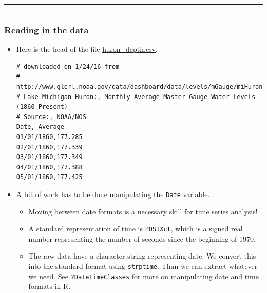 \documentclass[]{article}
\begin{document}
\begin{center}\rule{0.5\linewidth}{\linethickness}\end{center}

\begin{center}\rule{0.5\linewidth}{\linethickness}\end{center}

\subsubsection{Reading in the data}\label{reading-in-the-data}

\begin{itemize}
\item
  Here is the head of the file
  \href{./huron_depth.csv}{huron\_depth.csv}.

\begin{verbatim}
# downloaded on 1/24/16 from
# http://www.glerl.noaa.gov/data/dashboard/data/levels/mGauge/miHuronMog.csv
# Lake Michigan-Huron:, Monthly Average Master Gauge Water Levels (1860-Present)
# Source:, NOAA/NOS
Date, Average
01/01/1860,177.285
02/01/1860,177.339
03/01/1860,177.349
04/01/1860,177.388
05/01/1860,177.425
\end{verbatim}
\item
  A bit of work has to be done manipulating the \texttt{Date} variable.

  \begin{itemize}
  \item
    Moving between date formats is a necessary skill for time series
    analysis!
  \item
    A standard representation of time is \texttt{POSIXct}, which is a
    signed real number representing the number of seconds since the
    beginning of 1970.
  \item
    The raw data have a character string representing date. We convert
    this into the standard format using \texttt{strptime}. Than we can
    extract whatever we need. See \texttt{?DateTimeClasses} for more on
    manipulating date and time formats in R.
  \end{itemize}
\end{itemize}
\end{document}
